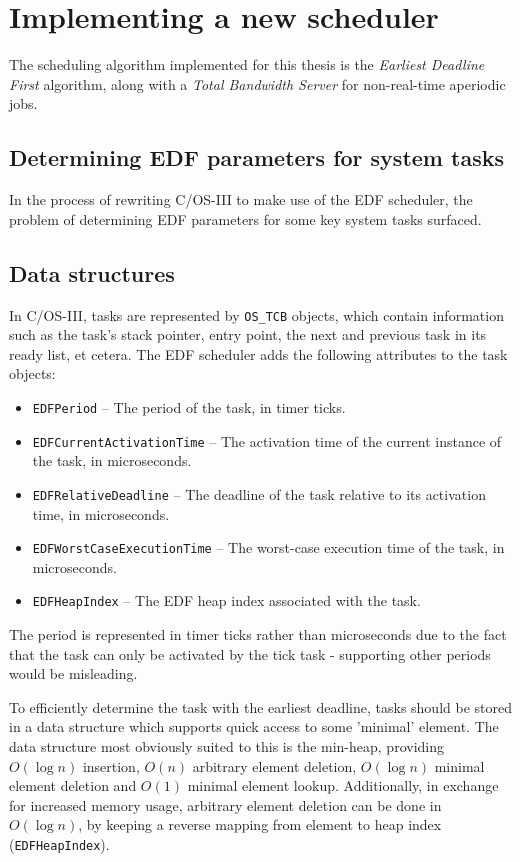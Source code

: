 \documentclass[twoside]{uva-inf-bachelor-thesis}
\newcommand{\code}[1]{\lstinline[breaklines=true]{#1}}
\newcommand{\ucosiii}{\textmu C/OS-III\xspace}
\begin{document}
\chapter{Implementing a new scheduler}
The scheduling algorithm implemented for this thesis is the \emph{Earliest Deadline First} algorithm, along with a \emph{Total Bandwidth Server} for non-real-time aperiodic jobs.

\section{Determining EDF parameters for system tasks}
In the process of rewriting \ucosiii to make use of the EDF scheduler, the problem of determining EDF parameters for some key system tasks surfaced.

\section{Data structures}
In \ucosiii, tasks are represented by \code{OS_TCB} objects, which contain information such as the task's stack pointer, entry point, the next and previous task in its ready list, et cetera. The EDF scheduler adds the following attributes to the task objects:

\begin{itemize}
    \item \code{EDFPeriod} -- The period of the task, in timer ticks.
    \item \code{EDFCurrentActivationTime} -- The activation time of the current instance of the task, in microseconds.
    \item \code{EDFRelativeDeadline} -- The deadline of the task relative to its activation time, in microseconds.
    \item \code{EDFWorstCaseExecutionTime} -- The worst-case execution time of the task, in microseconds.
    \item \code{EDFHeapIndex} -- The EDF heap index associated with the task.
\end{itemize}

The period is represented in timer ticks rather than microseconds due to the fact that the task can only be activated by the tick task - supporting other periods would be misleading.

To efficiently determine the task with the earliest deadline, tasks should be stored in a data structure which supports quick access to some 'minimal' element. The data structure most obviously suited to this is the min-heap, providing $O(\log n)$ insertion, $O(n)$ arbitrary element deletion, $O(\log n)$ minimal element deletion and $O(1)$ minimal element lookup. Additionally, in exchange for increased memory usage, arbitrary element deletion can be done in $O(\log n)$, by keeping a reverse mapping from element to heap index (\code{EDFHeapIndex}).
\end{document}
